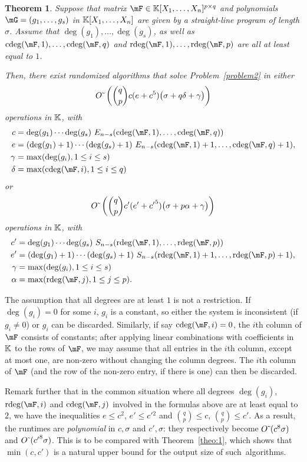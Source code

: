 \documentclass[12pt]{article}
\newtheorem{theorem}[definition]{Theorem}
\begin{document}
\begin{theorem}\label{theo:2}
  Suppose that matrix $\mF \in \KK[X_1,\dots,X_n]^{p \times q}$ and
  polynomials $\mG=(g_1,\dots,g_s)$ in $\mathbb{K}[X_1,\dots,X_n]$ are given by
  a straight-line program of length $\sigma$. Assume that
  $\deg(g_1),\dots,\deg(g_s)$, as well as
  $\cdeg(\mF,1), \ldots, \cdeg(\mF,q)$ and
  $\rdeg(\mF,1), \ldots, \rdeg(\mF,p)$ are all at least equal to $1$.

  Then, there exist randomized algorithms that solve
  Problem~\eqref{problem2} in either
   $${O}{\,\tilde{ }\,}\left (
     {q \choose p} c(e+c^5 )\big(\sigma + q \delta + \gamma  \big )
   \right)$$
  operations in $\mathbb{K}$, with
  \begin{align*}
    c&=\deg(g_1)\cdots\deg(g_s)\ E_{n-s}(\cdeg(\mF,1), \ldots, \cdeg(\mF,q))\\
    e&=(\deg(g_1)+1)\cdots(\deg(g_s)+1)\ E_{n-s}(\cdeg(\mF,1)+1, \ldots, \cdeg(\mF,q)+1),\\
    \gamma&= \max(\deg(g_i), 1\leq i \leq s)\\
    \delta &= \max(\cdeg(\mF,i), 1\leq i \leq q)
  \end{align*}
  or 
   $${O}{\,\tilde{ }\,}\left (
     {q \choose p} c'(e'+{c'}^5 )\big(\sigma + p \alpha  +\gamma \big )
   \right)$$
  operations in $\mathbb{K}$, with 
\begin{align*}
  c'&=\deg(g_1)\cdots\deg(g_s)\ S_{n-s}(\rdeg(\mF,1), \ldots, \rdeg(\mF,p))\\
  e'&=(\deg(g_1)+1)\cdots(\deg(g_s)+1)\ S_{n-s}(\rdeg(\mF,1)+1, \ldots, \rdeg(\mF,p)+1),\\
    \gamma&= \max(\deg(g_i), 1\leq i \leq s)\\
    \alpha &= \max(\rdeg(\mF,j), 1\leq j \leq p).
\end{align*}
\end{theorem}
The assumption that all degrees are at least $1$ is not a restriction.
If $\deg(g_i)=0$ for some $i$, $g_i$ is a constant, so either the
system is inconsistent (if $g_i \ne 0$) or $g_i$ can be
discarded. Similarly, if say $\cdeg(\mF,i)=0$, the $i$th column of
$\mF$ consists of constants; after applying linear combinations with
coefficients in $\mathbb{K}$ to the rows of $\mF$, we may assume that all
entries in the $i$th column, except at most one, are non-zero without
changing the column degrees. The $i$th column of $\mF$ (and the row of
the non-zero entry, if there is one) can then be discarded.

Remark further that in the common situation where all degrees
$\deg(g_i)$, $\rdeg(\mF,i)$ and $\cdeg(\mF,j)$ involved in the
formulas above are at least equal to $2$, we have the inequalities $e
\le c^2$, $e' \le {c'}{}^2$ and $\binom{q}{p}\leq c$,
$\binom{q}{p}\leq c'$. As a result, the runtimes are {\em polynomial}
in $c,\sigma$ and $c',\sigma$: they respectively become
${O}{\,\tilde{ }\,} (c^8 \sigma)$ and ${O}{\,\tilde{ }\,} ({c'}^8 \sigma)$.  This is to be
compared with Theorem~\ref{theo:1}, which shows that $\min(c,c')$ is a
natural upper bound for the output size of such~algorithms.
\end{document}
